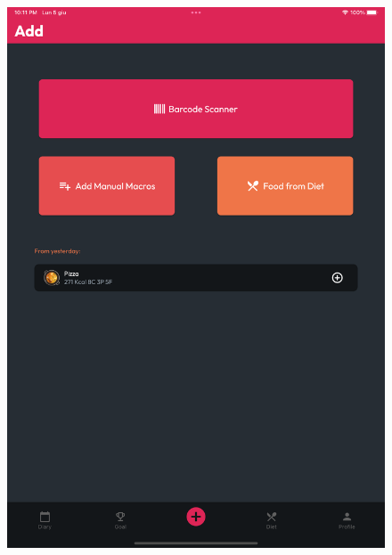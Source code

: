 \documentclass{Configuration_Files/PoliMi3i_thesis}
\begin{document}
\begin{figure}[!h]
  \centering
  \includegraphics[scale=0.1]{Images/Screenshots/Tablet/AddTablet.png}

\end{figure}
\end{document}
